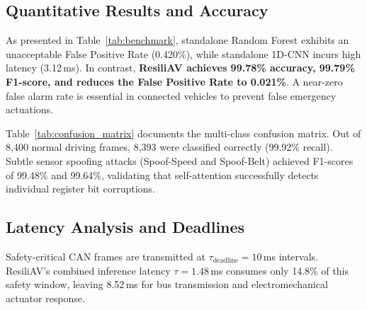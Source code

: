 \documentclass[conference]{IEEEtran}
\begin{document}
\subsection{Quantitative Results and Accuracy}
As presented in Table~\ref{tab:benchmark}, standalone Random Forest exhibits an unacceptable False Positive Rate (0.420\%), while standalone 1D-CNN incurs high latency (3.12\,ms). In contrast, \textbf{ResiliAV achieves 99.78\% accuracy, 99.79\% F1-score, and reduces the False Positive Rate to 0.021\%}. A near-zero false alarm rate is essential in connected vehicles to prevent false emergency actuations.

Table~\ref{tab:confusion_matrix} documents the multi-class confusion matrix. Out of 8,400 normal driving frames, 8,393 were classified correctly (99.92\% recall). Subtle sensor spoofing attacks (Spoof-Speed and Spoof-Belt) achieved F1-scores of 99.48\% and 99.64\%, validating that self-attention successfully detects individual register bit corruptions.

\subsection{Latency Analysis and Deadlines}
Safety-critical CAN frames are transmitted at $\tau_{\text{deadline}} = 10$\,ms intervals. ResiliAV's combined inference latency $\tau = 1.48$\,ms consumes only 14.8\% of this safety window, leaving 8.52\,ms for bus transmission and electromechanical actuator response.
\end{document}
